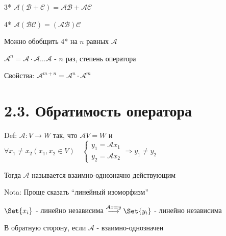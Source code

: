 \documentclass[12pt]{article}
\begin{document}
    3* $\mathcal{A} (\mathcal{B} + \mathcal{C}) = \mathcal{A}\mathcal{B} + \mathcal{A}\mathcal{C}$

    4* $\mathcal{A} (\mathcal{B}\mathcal{C}) = (\mathcal{A}\mathcal{B}) \mathcal{C}$


    \Nota Можно обобщить 4* на $n$ равных $\mathcal{A}$

    \Def $\mathcal{A}^n = \mathcal{A} \cdot \mathcal{A} \dots \mathcal{A}$ - $n$ раз, степень оператора

    Свойства: $\mathcal{A}^{m + n} = \mathcal{A}^n \cdot \mathcal{A}^m$

    \section{2.3. Обратимость оператора}

    \hypertarget{onetoonelinearoperator}{}

    Def: $\mathcal{A} : V \rightarrow W$ так, что $\mathcal{A}V = W$ и $\forall x_1 \neq x_2 (x_1, x_2 \in V) \quad
    \begin{cases}y_1 = \mathcal{A}x_1 \\ y_2 = \mathcal{A}x_2\end{cases} \Longrightarrow y_1 \neq y_2$

    Тогда $\mathcal{A}$ называется взаимно-однозначно действующим

    Nota: Проще сказать \enquote{линейный изоморфизм}

    \Th $\Set{x_i}$ - линейно независима $\stackrel{\mathcal{A}x = y}{\longrightarrow} \Set{y_i}$ - линейно независима

    В обратную сторону, если $\mathcal{A}$ - взаимно-однозначен
\end{document}
